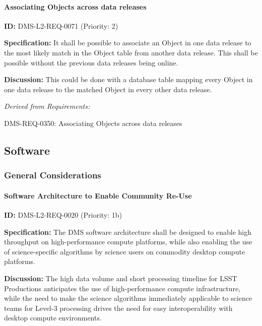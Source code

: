 \documentclass[SE,toc,lsstdraft]{lsstdoc}
\begin{document}
\paragraph{Associating Objects across data releases}\hfill  %

\label{DMS-L2-REQ-0071}
\textbf{ID:} DMS-L2-REQ-0071 (Priority: 2)

\textbf{Specification:} It shall be possible to associate an Object in one data release to the most likely match in the Object table from another data release. This shall be possible without the previous data releases being online.

\textbf{Discussion:} This could be done with a database table mapping every Object in one data release to the matched Object in every other data release.

\emph{Derived from Requirements:}

DMS-REQ-0350:
Associating Objects across data releases \newline

\subsection{Software}

\subsubsection{General Considerations}

\paragraph{Software Architecture to Enable Community Re-Use}\hfill  %

\label{DMS-L2-REQ-0020}
\textbf{ID:} DMS-L2-REQ-0020 (Priority: 1b)

\textbf{Specification:} The DMS software architecture shall be designed to enable high throughput on high-performance compute platforms, while also enabling the use of science-specific algorithms by science users on commodity desktop compute platforms.

\textbf{Discussion: }The high data volume and short processing timeline for LSST Productions anticipates the use of high-performance compute infrastructure, while the need to make the science algorithms immediately applicable to science teams for Level-3 processing drives the need for easy interoperability with desktop compute environments.
\end{document}
